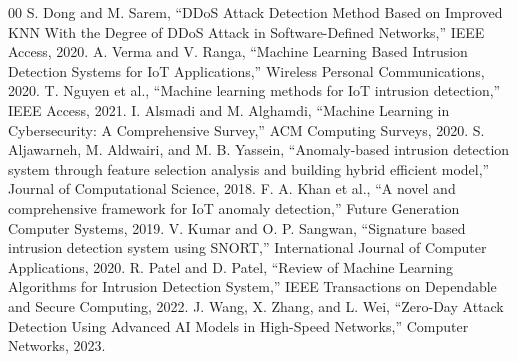 \documentclass[conference]{IEEEtran}
\begin{document}
\begin{thebibliography}{00}
 S. Dong and M. Sarem, ``DDoS Attack Detection Method Based on Improved KNN With the Degree of DDoS Attack in Software-Defined Networks,'' IEEE Access, 2020.
 A. Verma and V. Ranga, ``Machine Learning Based Intrusion Detection Systems for IoT Applications,'' Wireless Personal Communications, 2020.
 T. Nguyen et al., ``Machine learning methods for IoT intrusion detection,'' IEEE Access, 2021.
 I. Alsmadi and M. Alghamdi, ``Machine Learning in Cybersecurity: A Comprehensive Survey,'' ACM Computing Surveys, 2020.
 S. Aljawarneh, M. Aldwairi, and M. B. Yassein, ``Anomaly-based intrusion detection system through feature selection analysis and building hybrid efficient model,'' Journal of Computational Science, 2018.
 F. A. Khan et al., ``A novel and comprehensive framework for IoT anomaly detection,'' Future Generation Computer Systems, 2019.
 V. Kumar and O. P. Sangwan, ``Signature based intrusion detection system using SNORT,'' International Journal of Computer Applications, 2020.
 R. Patel and D. Patel, ``Review of Machine Learning Algorithms for Intrusion Detection System,'' IEEE Transactions on Dependable and Secure Computing, 2022.
 J. Wang, X. Zhang, and L. Wei, ``Zero-Day Attack Detection Using Advanced AI Models in High-Speed Networks,'' Computer Networks, 2023.
\end{thebibliography}
\end{document}
